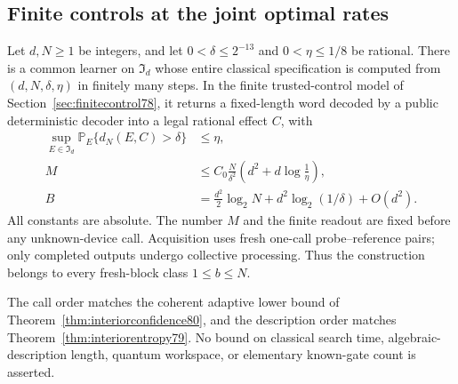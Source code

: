 \subsection{Finite controls at the joint optimal rates}
\begin{theorem}
\label{thm:effectiveinterior80}
Let $d,N\ge1$ be integers, and let
$0<\delta\le2^{-13}$ and $0<\eta\le1/8$ be rational.
There is a common learner on $\mathfrak I_d$ whose entire classical
specification is computed from $(d,N,\delta,\eta)$ in finitely
many steps.  In the finite trusted-control model of
Section~\ref{sec:finitecontrol78}, it returns a fixed-length word
decoded by a public deterministic decoder into a legal rational
effect $C$, with
\begin{align}
 \sup_{E\in\mathfrak I_d}
  \mathbb P_E\{d_N(E,C)>\delta\}&\le\eta,
                                         \label{eq:effectiverisk80}\\
 M&\le C_0\frac{N}{\delta^2}
                \left(d^2+d\log\frac1\eta\right),
                                         \label{eq:effectivecalls80}\\
 B&=\frac{d^2}{2}\log_2N+d^2\log_2(1/\delta)+O(d^2).
                                         \label{eq:effectivepayload80}
\end{align}
All constants are absolute.  The number $M$ and the finite readout
are fixed before any unknown-device call.  Acquisition uses fresh
one-call probe--reference pairs; only completed outputs undergo
collective processing.  Thus the construction belongs to every
fresh-block class $1\le b\le N$.

The call order matches the coherent adaptive lower bound of
Theorem~\ref{thm:interiorconfidence80}, and the description order
matches Theorem~\ref{thm:interiorentropy79}.  No bound on classical
search time, algebraic-description length, quantum workspace, or
elementary known-gate count is asserted.
\end{theorem}
